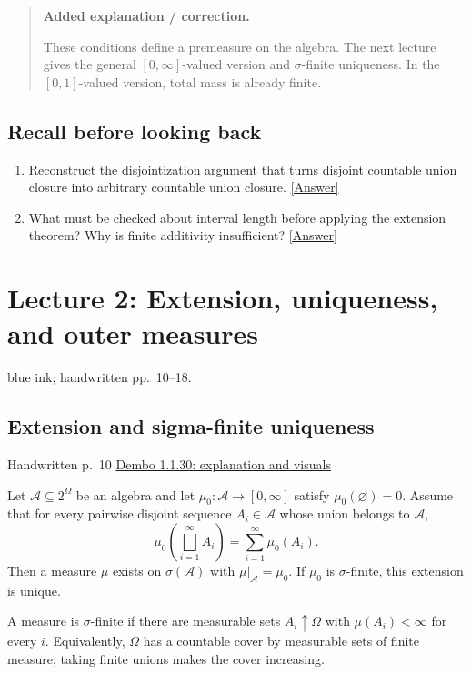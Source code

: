 \documentclass[11pt,letterpaper]{article}
\newcommand{\lecturesection}[1]{\subsection{#1}}
\begin{document}
\begin{quote}\small\textbf{Added explanation / correction.}

These conditions define a premeasure on the algebra. The next lecture gives the general $[0,\infty]$-valued version and $\sigma$-finite uniqueness. In the $[0,1]$-valued version, total mass is already finite.
\end{quote}

\subsection*{Recall before looking back}
\begin{enumerate}
\item Reconstruct the disjointization argument that turns disjoint countable union closure into arbitrary countable union closure. \hyperlink{answer-l1-s2}{[Answer]}
\item What must be checked about interval length before applying the extension theorem? Why is finite additivity insufficient? \hyperlink{answer-l1-s9}{[Answer]}
\end{enumerate}

\clearpage
{}
\section{Lecture 2: Extension, uniqueness, and outer measures}
{\small blue ink; handwritten pp.\ 10--18.}

\hypertarget{l2-s1}{}
\lecturesection{Extension and sigma-finite uniqueness}
{\small\textcolor{lectureink}{Handwritten p.\ 10} \quad \href{https://josephrbailey.com/probability/\#entry-1-1-30}{Dembo 1.1.30: explanation and visuals}}

Let $\mathcal A\subseteq2^\Omega$ be an algebra and let $\mu_0:\mathcal A\to[0,\infty]$ satisfy $\mu_0(\varnothing)=0$. Assume that for every pairwise disjoint sequence $A_i\in\mathcal A$ whose union belongs to $\mathcal A$, \[\mu_0\!\left(\bigsqcup_{i=1}^{\infty}A_i\right)=\sum_{i=1}^{\infty}\mu_0(A_i).\] Then a measure $\mu$ exists on $\sigma(\mathcal A)$ with $\mu|_{\mathcal A}=\mu_0$. If $\mu_0$ is $\sigma$-finite, this extension is unique.

A measure is $\sigma$-finite if there are measurable sets $A_i\uparrow\Omega$ with $\mu(A_i)<\infty$ for every $i$. Equivalently, $\Omega$ has a countable cover by measurable sets of finite measure; taking finite unions makes the cover increasing.
\end{document}
